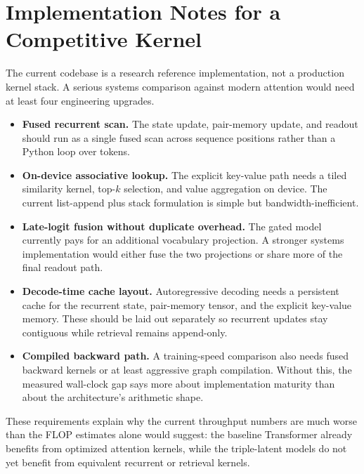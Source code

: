 \documentclass[11pt]{article}
\begin{document}
\appendix
\section{Implementation Notes for a Competitive Kernel}
The current codebase is a research reference implementation, not a production
kernel stack. A serious systems comparison against modern attention would need
at least four engineering upgrades.
\begin{itemize}[leftmargin=1.25em]
  \item \textbf{Fused recurrent scan.} The state update, pair-memory update,
  and readout should run as a single fused scan across sequence positions
  rather than a Python loop over tokens.
  \item \textbf{On-device associative lookup.} The explicit key-value path
  needs a tiled similarity kernel, top-$k$ selection, and value aggregation on
  device. The current list-append plus stack formulation is simple but
  bandwidth-inefficient.
  \item \textbf{Late-logit fusion without duplicate overhead.} The gated model
  currently pays for an additional vocabulary projection. A stronger systems
  implementation would either fuse the two projections or share more of the
  final readout path.
  \item \textbf{Decode-time cache layout.} Autoregressive decoding needs a
  persistent cache for the recurrent state, pair-memory tensor, and the
  explicit key-value memory. These should be laid out separately so recurrent
  updates stay contiguous while retrieval remains append-only.
  \item \textbf{Compiled backward path.} A training-speed comparison also needs
  fused backward kernels or at least aggressive graph compilation. Without
  this, the measured wall-clock gap says more about implementation maturity
  than about the architecture's arithmetic shape.
\end{itemize}
These requirements explain why the current throughput numbers are much worse
than the FLOP estimates alone would suggest: the baseline Transformer already
benefits from optimized attention kernels, while the triple-latent models do
not yet benefit from equivalent recurrent or retrieval kernels.



\end{document}

